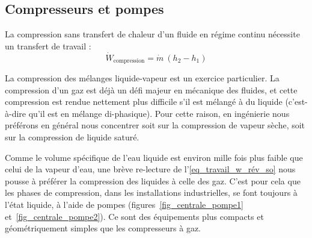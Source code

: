 	\subsection{Compresseurs et pompes}
	\label{ch_moteurs_vapeur_compresseurs_et_pompes}

		La compression sans transfert de chaleur d’un fluide en régime continu nécessite un transfert de travail :
		\begin{equation}
			\dot{W}_\text{compression} = \dot{m} \ (h_2 - h_1)
		\end{equation}

		La compression des mélanges liquide-vapeur est un exercice particulier. La compression d’un gaz est déjà un défi majeur en mécanique des fluides, et cette compression est rendue nettement plus difficile s’il est mélangé à du liquide (c’est-à-dire qu’il est en mélange di-phasique). Pour cette raison, en ingénierie nous préférons en général nous concentrer soit sur la compression de vapeur sèche, soit sur la compression de liquide saturé.

		Comme le volume spécifique de l’eau liquide est environ mille fois plus faible que celui de la vapeur d’eau, une brève re-lecture de l’\cref{eq_travail_w_rév_so} nous pousse à préférer la compression des liquides à celle des gaz. C’est pour cela que les phases de compression, dans les installations industrielles, se font toujours à l’état liquide, à l’aide de pompes (figures~\ref{fig_centrale_pompe1} et~\ref{fig_centrale_pompe2}). Ce sont des équipements plus compacts et géométriquement simples que les compresseurs à gaz.

